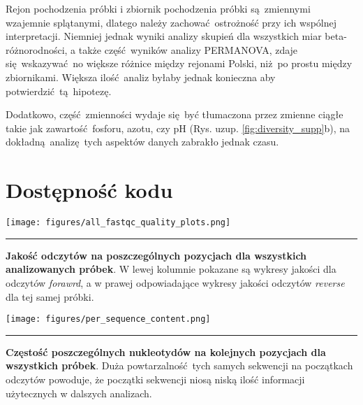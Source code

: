 \documentclass[two column, twoside, a4paper]{article}
\begin{document}
Rejon pochodzenia próbki i zbiornik pochodzenia próbki są zmiennymi wzajemnie splątanymi, dlatego należy zachować ostrożność przy ich wspólnej interpretacji. Niemniej jednak wyniki analizy skupień dla wszystkich miar beta-różnorodności, a także część wyników analizy PERMANOVA, zdaje się wskazywać no większe różnice między rejonami Polski, niż po prostu między zbiornikami. Większa ilość analiz byłaby jednak konieczna aby potwierdzić tą hipotezę.

Dodatkowo, część zmienności wydaje się być tłumaczona przez zmienne ciągłe takie jak zawartość fosforu, azotu, czy pH (Rys. uzup. \ref{fig:diversity_supp}b), na dokładną analizę tych aspektów danych zabrakło jednak czasu.

\section{Dostępność kodu}



\newpage
\printbibliography

\newpage
\newpage

\begin{suppfigure*}[h]
  \begin{center}
    \texttt{[image: figures/all\_fastqc\_quality\_plots.png]}
  \end{center}

  \hrule width0.5\textwidth \vspace{0.5em}

  \caption{\textbf{Jakość odczytów na poszczególnych pozycjach dla wszystkich analizowanych próbek}. W lewej kolumnie pokazane są wykresy jakości dla odczytów \textit{forawrd}, a w prawej odpowiadające wykresy jakości odczytów \textit{reverse} dla tej samej próbki.}
  \label{fig:quality}
\end{suppfigure*}


\begin{suppfigure*}[h]
  \begin{center}
    \texttt{[image: figures/per\_sequence\_content.png]}
  \end{center}

  \hrule width0.5\textwidth \vspace{0.5em}

  \caption{\textbf{Częstość poszczególnych nukleotydów na kolejnych pozycjach dla wszystkich próbek}. Duża powtarzalność tych samych sekwencji na początkach odczytów powoduje, że początki sekwencji niosą niską ilość informacji użytecznych w dalszych analizach.}
  \label{fig:content}
\end{suppfigure*}
\end{document}
